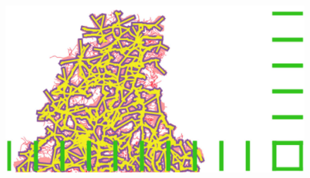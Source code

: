 




\begin{figure}
	\includegraphics[width=\textheight,angle=90]{Figures/Final/CL-artwork.jpg}
\end{figure}











